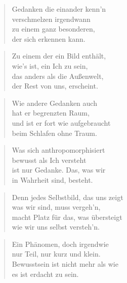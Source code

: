 \documentclass[10pt,a4paper]{article}
\begin{document}
\begin{paracol}{2}
\begin{verse}
Gedanken die einander kenn’n \\
verschmelzen irgendwann \\
zu einem ganz besonderen, \\
der sich erkennen kann. \\
\end{verse}

\begin{verse}
Zu einem der ein Bild enthält, \\
wie’s ist, ein Ich zu sein, \\
das anders als die Außenwelt, \\
der Rest von uns, erscheint. \\
\end{verse}

\begin{verse}
Wie andere Gedanken auch \\
hat er begrenzten Raum, \\
und ist er fort wie aufgebraucht \\
beim Schlafen ohne Traum. \\
\end{verse}

\begin{verse}
Was sich anthropomorphisiert \\
bewusst als Ich versteht \\
ist nur Gedanke. Das, was wir \\
in Wahrheit sind, besteht. \\
\end{verse}

\begin{verse}
Denn jedes Selbstbild, das uns zeigt \\
was wir sind, muss vergeh’n, \\
macht Platz für das, was übersteigt \\
wie wir uns selbst versteh’n. \\
\end{verse}

\begin{verse}
Ein Phänomen, doch irgendwie \\
nur Teil, nur kurz und klein. \\
Bewusstsein ist nicht mehr als wie \\
es ist erdacht zu sein. \\
\end{verse}


\end{paracol}
\end{document}
